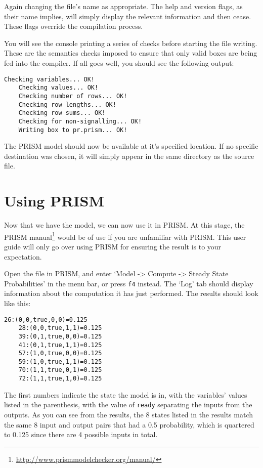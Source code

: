 \documentclass[report.tex]{subfiles}
\begin{document}
Again changing the file's name as appropriate. The help and version flags, as
their name implies, will simply display the relevant information and then cease.
These flags override the compilation process.

You will see the console printing a series of checks before starting the file
writing. These are the semantics checks imposed to ensure that only valid
boxes are being fed into the compiler. If all goes well, you should see the
following output:

\begin{lstlisting}[frame = single]
    Checking variables... OK!
    Checking values... OK!
    Checking number of rows... OK!
    Checking row lengths... OK!
    Checking row sums... OK!
    Checking for non-signalling... OK!
    Writing box to pr.prism... OK!
\end{lstlisting}

The PRISM model should now be available at it's specified location. If no
specific destination was chosen, it will simply appear in the same directory as
the source file.

\section{Using PRISM} %
\label{sec:using_prism}
Now that we have the model, we can now use it in PRISM. At this stage, the PRISM
manual\footnote{\url{http://www.prismmodelchecker.org/manual/}} would be of use
if you are unfamiliar with PRISM. This user guide will only go over using PRISM
for ensuring the result is to your expectation.

Open the file in PRISM, and enter `Model -> Compute -> Steady State
Probabilities' in the menu bar, or press \texttt{f4} instead. The `Log' tab
should display information about the computation it has just performed. The
results should look like this:

\begin{lstlisting}[frame = single]
    26:(0,0,true,0,0)=0.125
    28:(0,0,true,1,1)=0.125
    39:(0,1,true,0,0)=0.125
    41:(0,1,true,1,1)=0.125
    57:(1,0,true,0,0)=0.125
    59:(1,0,true,1,1)=0.125
    70:(1,1,true,0,1)=0.125
    72:(1,1,true,1,0)=0.125
\end{lstlisting}

The first numbers indicate the state the model is in, with the variables'
values listed in the parenthesis, with the value of \texttt{ready} separating
the inputs from the outputs. As you can see from the results, the 8 states
listed in the results match the same 8 input and output pairs that had a 0.5
probability, which is quartered to 0.125 since there are 4 possible inputs in
total.
\end{document}

